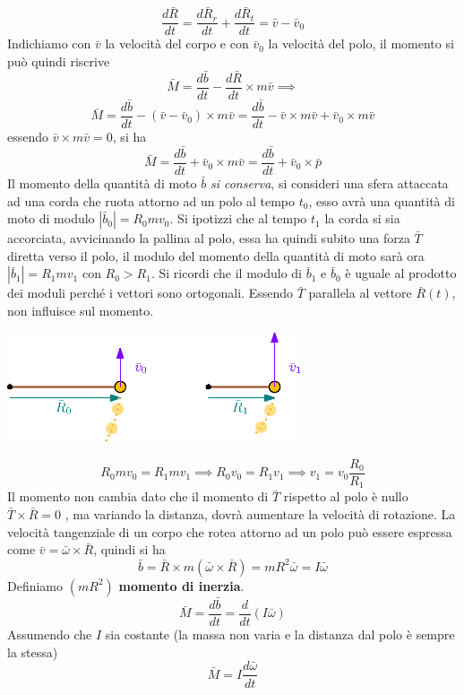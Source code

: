 \documentclass[10pt, letterpaper]{report}
\begin{document}
$$\frac{d\bar R}{dt}=\frac{d\bar R_r}{dt}+\frac{d\bar R_t}{dt} = \bar v - \bar v_0$$
Indichiamo con $\bar v$ la velocità del corpo e con $\bar v_0$ la velocità del polo, 
il momento si può quindi riscrive
$$\bar M=\frac{d\bar b}{dt}-\frac{d\bar R}{dt}\times m \bar v\implies $$
$$ \bar M = \frac{d\bar b}{dt} -  ( \bar v - \bar v_0)\times m \bar v=
\frac{d\bar b}{dt} -   \bar v\times m \bar v + \bar v_0\times m \bar v 
$$
essendo $\bar v\times m \bar v=0$, si ha
$$\bar M =  \frac{d\bar b}{dt} + \bar v_0\times m \bar v =\frac{d\bar b}{dt}+\bar v_0\times \bar p$$
Il momento della quantità di moto $\bar b$ \textit{si conserva}, si consideri una sfera 
attaccata ad una corda che ruota attorno ad un polo al tempo $t_0$, esso avrà una quantità di moto di modulo
$ |\bar b_0| = R_0mv_0$. Si ipotizzi che al tempo $t_1$ la corda si sia accorciata, avvicinando la 
pallina al polo, essa ha quindi subito una forza $\bar T$ diretta verso il polo, il modulo del momento 
della quantità di moto sarà ora $|\bar b_1|=R_1mv_1$ con $R_0>R_1$. Si ricordi che il modulo di $\bar b_1$ e $\bar b_0$ è uguale al prodotto dei moduli perché i vettori sono ortogonali. Essendo $\bar T$   parallela 
 al vettore $\bar R(t)$, non influisce sul momento.\begin{center}
    \includegraphics[width=0.65\textwidth]{images/conservMomento.eps}
 \end{center}
 $$ R_0mv_0=R_1mv_1\implies R_0v_0=R_1v_1\implies v_1=v_0\frac{R_0}{R_1}$$
Il momento non cambia dato che il momento di $\bar T$ rispetto al polo 
è nullo $\bar T \times \bar R =0$ , ma variando la distanza, dovrà aumentare la velocità di rotazione.\acc 
La velocità tangenziale di un corpo che rotea attorno ad un polo può essere espressa come $\bar v=\bar \omega \times \bar R$, 
quindi si ha 
$$ \bar b = \bar R \times m (\bar \omega\times  \bar R)=mR^2\bar \omega = I\bar \omega$$
Definiamo $(mR^2)$ \textbf{momento di inerzia}. 
$$ \bar M = \frac{d\bar b }{dt}=\frac{d}{dt}(I\bar \omega)$$
Assumendo che $I$ sia costante (la massa non varia e la distanza dal polo è sempre la stessa)
$$ \bar M = I\frac{d\bar \omega}{dt}$$
\end{document}
